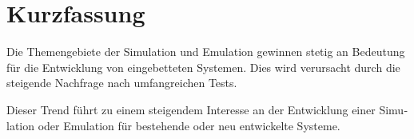 
\chapter{Kurzfassung}
\begin{german}
Die Themengebiete der Simulation und Emulation gewinnen stetig an Bedeutung für die Entwicklung von eingebetteten Systemen.
Dies wird verursacht durch die steigende Nachfrage nach umfangreichen Tests.

Dieser Trend führt zu einem steigendem Interesse an der Entwicklung einer Simulation oder Emulation für bestehende oder neu entwickelte Systeme.
    
\end{german}

